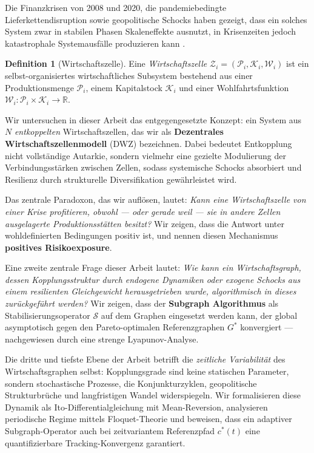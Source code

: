 \documentclass[a4paper, 12pt, twoside, openright]{report}
\theoremstyle{definition}
\newtheorem{definition}[theorem]{Definition}
\theoremstyle{definition}
\begin{document}
Die Finanzkrisen von 2008 und 2020, die pandemiebedingte Lieferkettendisruption sowie
geopolitische Schocks haben gezeigt, dass ein solches System zwar in stabilen Phasen
Skaleneffekte ausnutzt, in Krisenzeiten jedoch katastrophale Systemausfälle produzieren kann
\citep{acemoglu2015systemic, haldane2011systemic}.

\begin{definition}[Wirtschaftszelle]
    Eine \emph{Wirtschaftszelle} $\mathcal{Z}_i = (\mathcal{P}_i, \mathcal{K}_i, \mathcal{W}_i)$
    ist ein selbst-organisiertes wirtschaftliches Subsystem bestehend aus einer
    Produktionsmenge $\mathcal{P}_i$, einem Kapitalstock $\mathcal{K}_i$ und einer
    Wohlfahrtsfunktion $\mathcal{W}_i : \mathcal{P}_i \times \mathcal{K}_i \to \mathbb{R}$.
\end{definition}

Wir untersuchen in dieser Arbeit das entgegengesetzte Konzept: ein System aus $N$
\emph{entkoppelten} Wirtschaftszellen, das wir als \textbf{Dezentrales Wirtschaftszellenmodell}
(DWZ) bezeichnen. Dabei bedeutet Entkopplung nicht vollständige Autarkie, sondern vielmehr
eine gezielte Modulierung der Verbindungsstärken zwischen Zellen, sodass systemische Schocks
absorbiert und Resilienz durch strukturelle Diversifikation gewährleistet wird.

Das zentrale Paradoxon, das wir auflösen, lautet: \emph{Kann eine Wirtschaftszelle von einer
Krise profitieren, obwohl --- oder gerade weil --- sie in andere Zellen ausgelagerte
Produktionsstätten besitzt?} Wir zeigen, dass die Antwort unter wohldefinierten Bedingungen
positiv ist, und nennen diesen Mechanismus \textbf{positives Risikoexposure}.

Eine zweite zentrale Frage dieser Arbeit lautet: \emph{Wie kann ein Wirtschaftsgraph, dessen
Kopplungsstruktur durch endogene Dynamiken oder exogene Schocks aus einem resilienten
Gleichgewicht herausgetrieben wurde, algorithmisch in dieses zurückgeführt werden?} Wir zeigen,
dass der \textbf{Subgraph Algorithmus} \citep{epp2026subgraph} als Stabilisierungsoperator
$\mathcal{S}$ auf dem Graphen eingesetzt werden kann, der global asymptotisch gegen den
Pareto-optimalen Referenzgraphen $G^*$ konvergiert --- nachgewiesen durch eine strenge
Lyapunov-Analyse.

Die dritte und tiefste Ebene der Arbeit betrifft die \emph{zeitliche Variabilität} des
Wirtschaftsgraphen selbst: Kopplungsgrade sind keine statischen Parameter, sondern
stochastische Prozesse, die Konjunkturzyklen, geopolitische Strukturbrüche und langfristigen
Wandel widerspiegeln. Wir formalisieren diese Dynamik als Ito-Differentialgleichung mit
Mean-Reversion, analysieren periodische Regime mittels Floquet-Theorie und beweisen, dass
ein adaptiver Subgraph-Operator auch bei zeitvariantem Referenzpfad $c^*(t)$ eine quantifizierbare
Tracking-Konvergenz garantiert.
\end{document}
